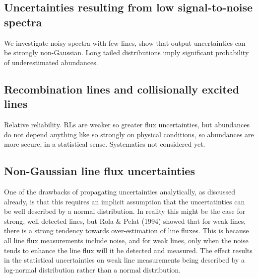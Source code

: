 \documentclass[useAMS,usenatbib]{mn2e}
\begin{document}


\subsection{Uncertainties resulting from low signal-to-noise spectra}

We investigate noisy spectra with few lines, show that output uncertainties can be strongly non-Gaussian.  Long tailed distributions imply significant probability of underestimated abundances.

\subsection{Recombination lines and collisionally excited lines}

Relative reliability.  RLs are weaker so greater flux uncertainties, but abundances do not depend anything like so strongly on physical conditions, so abundances are more secure, in a statistical sense.  Systematics not considered yet.

\subsection{Non-Gaussian line flux uncertainties}

One of the drawbacks of propagating uncertainties analytically, as discussed already, is that this requires an implicit assumption that the uncertatinties can be well described by a normal distribution.  In reality this might be the case for strong, well detected lines, but Rola \& Pelat (1994) showed that for weak lines, there is a strong tendency towards over-estimation of line fluxes.  This is because all line flux measurements include noise, and for weak lines, only when the noise tends to enhance the line flux will it be detected and measured.  The effect results in the statistical uncertainties on weak line measurements being described by a log-normal distribution rather than a normal distribution.
\end{document}
